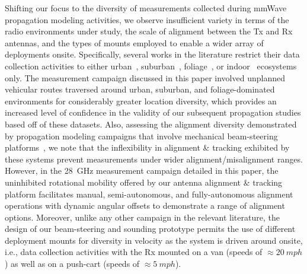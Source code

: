 \documentclass[12pt, draftcls, onecolumn]{IEEEtran}
\begin{document}
Shifting our focus to the diversity of measurements collected during mmWave propagation modeling activities, we observe insufficient variety in terms of the radio environments under study, the scale of alignment between the Tx and Rx antennas, and the types of mounts employed to enable a wider array of deployments onsite. Specifically, several works in the literature restrict their data collection activities to either urban~\cite{Outdoor28G, PDAPs, QDC_NIST, DopplerHST, V2XBlockages, MacCartneyUrbanHumanBlockage}, suburban~\cite{Purdue, SuburbanGeometryJournal}, foliage~\cite{Foliage, FoliageSimulations}, or indoor~\cite{AgileLink, Harvard, SpatialConsistencyOriginal, SpatialDynamics, Indoor60G, D2DHumanBlockage} ecosystems only. The measurement campaign discussed in this paper involved unplanned vehicular routes traversed around urban, suburban, and foliage-dominated environments for considerably greater location diversity, which provides an increased level of confidence in the validity of our subsequent propagation studies based off of these datasets. Also, assessing the alignment diversity demonstrated by propagation modeling campaigns that involve mechanical beam-steering platforms~\cite{Purdue, Harvard, SpatialConsistencyOriginal, SpatialDynamics, SuburbanGeometryJournal, Outdoor28G, QDC_NIST, D2DHumanBlockage, MacCartneyUrbanHumanBlockage}, we note that the inflexibility in alignment \& tracking exhibited by these systems prevent measurements under wider alignment/misalignment ranges. However, in the \SI{28}{\giga\hertz} measurement campaign detailed in this paper, the uninhibited rotational mobility offered by our antenna alignment \& tracking platform facilitates manual, semi-autonomous, and fully-autonomous alignment operations with dynamic angular offsets to demonstrate a range of alignment options. Moreover, unlike any other campaign in the relevant literature, the design of our beam-steering and sounding prototype permits the use of different deployment mounts for diversity in velocity as the system is driven around onsite, i.e., data collection activities with the Rx mounted on a van (speeds of ${\approx}\SI{20}{mph}$) as well as on a push-cart (speeds of ${\approx}\SI{5}{mph}$).
\end{document}
